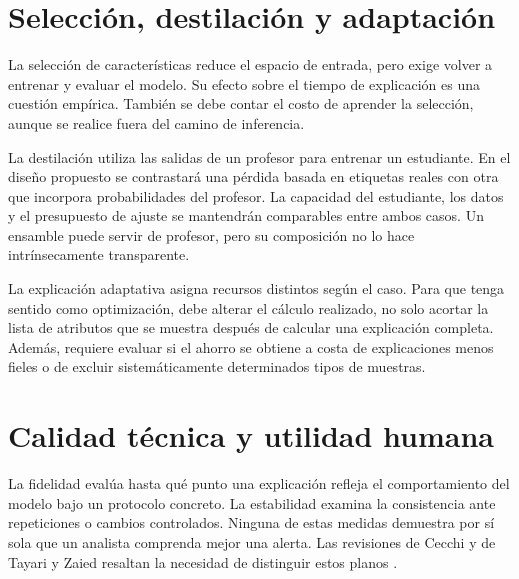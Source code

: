 \section{Selección, destilación y adaptación}
La selección de características reduce el espacio de entrada, pero exige volver a entrenar y evaluar el modelo. Su efecto sobre el tiempo de explicación es una cuestión empírica. También se debe contar el costo de aprender la selección, aunque se realice fuera del camino de inferencia.

La destilación utiliza las salidas de un profesor para entrenar un estudiante. En el diseño propuesto se contrastará una pérdida basada en etiquetas reales con otra que incorpora probabilidades del profesor. La capacidad del estudiante, los datos y el presupuesto de ajuste se mantendrán comparables entre ambos casos. Un ensamble puede servir de profesor, pero su composición no lo hace intrínsecamente transparente.

La explicación adaptativa asigna recursos distintos según el caso. Para que tenga sentido como optimización, debe alterar el cálculo realizado, no solo acortar la lista de atributos que se muestra después de calcular una explicación completa. Además, requiere evaluar si el ahorro se obtiene a costa de explicaciones menos fieles o de excluir sistemáticamente determinados tipos de muestras.

\section{Calidad técnica y utilidad humana}
La fidelidad evalúa hasta qué punto una explicación refleja el comportamiento del modelo bajo un protocolo concreto. La estabilidad examina la consistencia ante repeticiones o cambios controlados. Ninguna de estas medidas demuestra por sí sola que un analista comprenda mejor una alerta. Las revisiones de Cecchi y de Tayari y Zaied resaltan la necesidad de distinguir estos planos \parencite{Cecchi2026Connecting,Tayari2026Clarity}.

